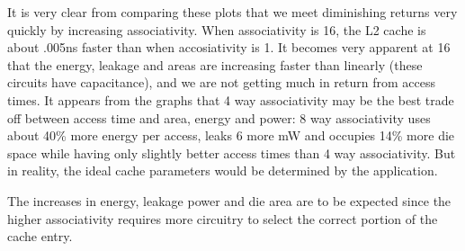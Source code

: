 \documentclass[a4paper, 11pt]{exam}
\begin{document}
\begin{enumerate}
\begin{enumerate}
\begin{figure}[H]
\begin{centering}
\end{centering}
\end{figure}
It is very clear from comparing these plots that we meet diminishing
returns very quickly by increasing associativity. When associativity
is 16, the L2 cache is about .005ns faster than when accosiativity is
1. It becomes very apparent at 16 that the energy, leakage and areas
are increasing faster than linearly (these circuits have capacitance),
and we are not getting much in return from access times. It appears
from the graphs that 4 way associativity may be the best trade off
between access time and area, energy and power: 8 way associativity
uses about 40\% more energy per access, leaks 6 more mW and occupies
14\% more die space while having only slightly better access times
than 4 way associativity. But in reality, the ideal cache parameters
would be determined by the application.

The increases in energy, leakage power and die area are to be expected since
the higher associativity requires more circuitry to select the correct portion
of the cache entry.

\end{enumerate}
\end{enumerate}
\end{document}
